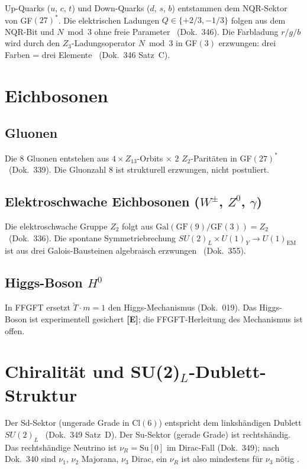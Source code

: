 Up-Quarks ($u$, $c$, $t$) und Down-Quarks ($d$, $s$, $b$) entstammen dem
NQR-Sektor von GF$(27)^*$.
Die elektrischen Ladungen $Q \in \{+2/3, -1/3\}$ folgen aus dem
NQR-Bit und $N \bmod 3$ ohne freie Parameter \BM\ (Dok.~346).
Die Farbladung $r/g/b$ wird durch den $Z_3$-Ladungsoperator
$N \bmod 3$ in GF$(3)$ erzwungen: drei Farben = drei Elemente \BM\
(Dok.~346 Satz~C).

\section{Eichbosonen}

\subsection*{Gluonen}

Die 8 Gluonen entstehen aus $4 \times Z_{13}$-Orbits $\times$ $2$
$Z_2$-Paritäten in GF$(27)^*$ \BM\ (Dok.~339).
Die Gluonzahl 8 ist strukturell erzwungen, nicht postuliert.

\subsection*{Elektroschwache Eichbosonen ($W^\pm$, $Z^0$, $\gamma$)}

Die elektroschwache Gruppe $Z_2$ folgt aus
$\mathrm{Gal}(\mathrm{GF}(9)/\mathrm{GF}(3)) = Z_2$ \KM\ (Dok.~336).
Die spontane Symmetriebrechung
$SU(2)_L \times U(1)_Y \to U(1)_\text{EM}$ ist aus drei
Galois-Bausteinen algebraisch erzwungen \BM\ (Dok.~355).

\subsection*{Higgs-Boson $H^0$}

In FFGFT ersetzt $\tilde{T} \cdot m = 1$ den Higgs-Mechanismus
(Dok.~019). Das Higgs-Boson ist experimentell gesichert \textbf{[E]};
die FFGFT-Herleitung des Mechanismus ist offen.

\section{Chiralität und SU(2)$_L$-Dublett-Struktur}

Der Sd-Sektor (ungerade Grade in Cl$(6)$) entspricht dem
linkshändigen Dublett $SU(2)_L$ \BM\ (Dok.~349 Satz~D).
Der Su-Sektor (gerade Grade) ist rechtshändig.
Das rechtshändige Neutrino ist $\nu_R = \mathrm{Su}[0]$ im Dirac-Fall (Dok.~349);
nach Dok.~340 sind $\nu_1$, $\nu_2$ Majorana, $\nu_3$ Dirac, ein $\nu_R$ ist also
mindestens für $\nu_3$ nötig \SM.

